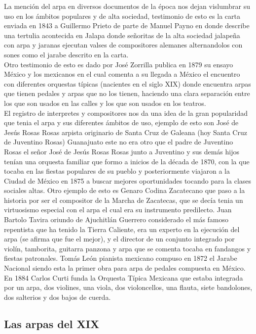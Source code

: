La mención del arpa en diversos documentos de la época nos dejan vislumbrar su uso en los ámbitos populares y de alta sociedad, testimonio de esto es la carta enviada en 1843 a Guillermo Prieto de parte de Manuel Payno en donde describe una tertulia acontecida en Jalapa donde señoritas de la alta sociedad jalapeña con arpa y jaranas ejecutan valses de compositores alemanes alternandolos con sones como el jarabe descrito en la carta. \\ Otro testimonio de esto es dado por José Zorrilla publica en 1879 su ensayo México y los mexicanos en el cual comenta a su llegada a México el encuentro con diferentes orquestas típicas (nacientes en el siglo XIX) donde encuentra arpas que tienen pedales y arpas que no los tienen, haciendo una clara separación entre los que son usados en las calles y los que son usados en los teatros.\\El registro de interpretes y compositores nos da una idea de la gran popularidad que tenia el arpa y sus diferentes ámbitos de uso, ejemplo de esto son  José de Jesús Rosas Rosas arpista originario de Santa Cruz de Galeana (hoy Santa Cruz de Juventino Rosas) Guanajuato este no era otro que el padre de Juventino Rosas el señor José de Jesús Rosas Rosas junto a Juventino y sus demás hijos tenían una orquesta familiar que formo a inicios de la década de 1870, con la que tocaba en las fiestas populares de su pueblo y posteriormente viajaron a la Ciudad de México en 1875 a buscar mejores oportunidades tocando para la clases sociales altas. Otro ejemplo de esto es Genaro Codina Zacatecano que paso a la historia por ser el compositor de la Marcha de Zacatecas, que se decía tenia un virtuosismo especial con el arpa el cual era su instrumento predilecto. Juan Bartolo Tavira oriundo de Ajuchitlán Guerrero considerado el más famoso repentista que ha tenido la Tierra Caliente, era un experto en la ejecución del arpa (se afirma que fue el mejor), y el director de un conjunto integrado por violín, tamborita, guitarra panzona y arpa que se comenta tocaba en fandangos y fiestas patronales. Tomás León pianista mexicano compuso en 1872 el Jarabe Nacional siendo esta la primer obra para arpa de pedales compuesta en México.\\
En 1884 Carlos Curti funda la Orquesta Típica Mexicana que estaba integrada por un arpa, dos violines, una viola, dos violoncellos, una flauta, siete bandolones, dos salterios y dos bajos de cuerda.

\subsection{Las arpas del XIX}

